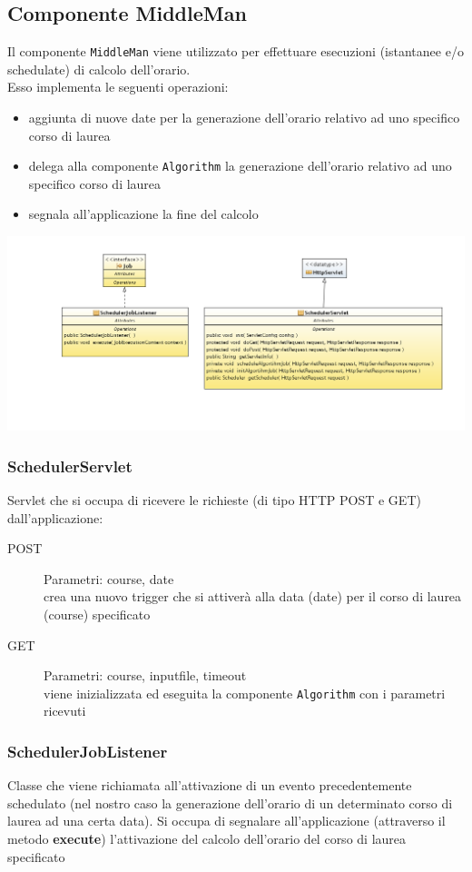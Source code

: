 \documentclass[11pt,a4paper]{article}
\begin{document}
\subsection{Componente MiddleMan}
Il componente \verb|MiddleMan| viene utilizzato per effettuare esecuzioni (istantanee e/o schedulate) di calcolo dell'orario. \\
Esso implementa le seguenti operazioni:
\begin{itemize}
\item aggiunta di nuove date per la generazione dell'orario relativo ad uno specifico corso di laurea
\item delega alla componente \verb|Algorithm| la generazione dell'orario relativo ad uno specifico corso di laurea
\item segnala all'applicazione la fine del calcolo
\end{itemize}
\begin{center}
 \includegraphics[scale=0.34]{images/MMserv_diagram_class.png}
\end{center}
\subsubsection{SchedulerServlet}
Servlet che si occupa di ricevere le richieste (di tipo HTTP POST e GET) dall'applicazione:
\begin{description}
\item[POST]
Parametri: course, date\\
crea una nuovo trigger che si attiverà alla data (date) per il corso di laurea (course) specificato
\item[GET]
Parametri: course, inputfile, timeout\\
viene inizializzata ed eseguita la componente \verb|Algorithm| con i parametri ricevuti
\end{description}
\subsubsection{SchedulerJobListener}
Classe che viene richiamata all'attivazione di un evento precedentemente schedulato (nel nostro caso la generazione dell'orario di un determinato corso di laurea ad una certa data).
Si occupa di segnalare all'applicazione (attraverso il metodo \textbf{execute}) l'attivazione del calcolo dell'orario del corso di laurea specificato
\end{document}
